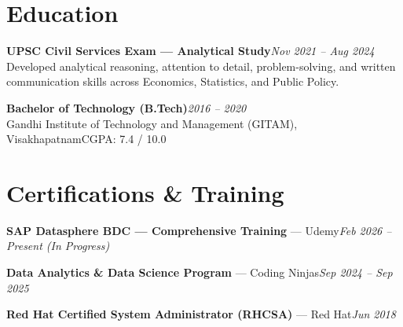 \documentclass[10pt, letterpaper]{article}
\begin{document}
\section{Education}

{\bfseries UPSC Civil Services Exam — Analytical Study}\hfill{\small\color{muted}\textit{Nov 2021 – Aug 2024}}\\
{\small\color{muted}Developed analytical reasoning, attention to detail, problem-solving, and written communication skills across Economics, Statistics, and Public Policy.}

\vspace{2pt}
{\bfseries Bachelor of Technology (B.Tech)}\hfill{\small\color{muted}\textit{2016 – 2020}}\\
{\small\color{muted}Gandhi Institute of Technology and Management (GITAM), Visakhapatnam\hfill CGPA: 7.4 / 10.0}

\section{Certifications \& Training}

{\bfseries SAP Datasphere BDC — Comprehensive Training} — Udemy\hfill{\small\color{muted}\textit{Feb 2026 – Present \emph{(In Progress)}}}

\vspace{1pt}
{\bfseries Data Analytics \& Data Science Program} — Coding Ninjas\hfill{\small\color{muted}\textit{Sep 2024 – Sep 2025}}

\vspace{1pt}
{\bfseries Red Hat Certified System Administrator (RHCSA)} — Red Hat\hfill{\small\color{muted}\textit{Jun 2018}}

\end{document}
